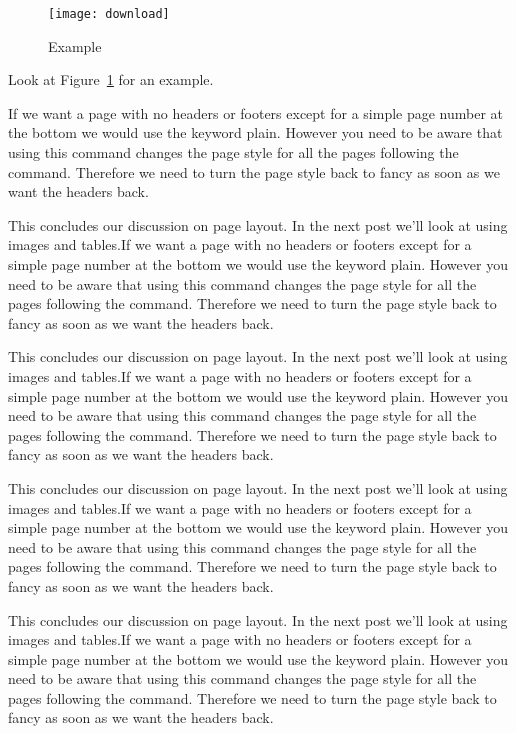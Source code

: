\begin{figure}[h]
    \centering
    \texttt{[image: download]}
    \caption{Example}
    \label{fig:results}
\end{figure}

Look at Figure~\ref{fig:results} for an example.

If we want a page with no headers or footers except for a simple page number at the bottom we would use the keyword plain. However you need to be aware that using this command changes the page style for all the pages following the command. Therefore we need to turn the page style back to fancy as soon as we want the headers back.

This concludes our discussion on page layout. In the next post we'll look at using images and tables.If we want a page with no headers or footers except for a simple page number at the bottom we would use the keyword plain. However you need to be aware that using this command changes the page style for all the pages following the command. Therefore we need to turn the page style back to fancy as soon as we want the headers back.

This concludes our discussion on page layout. In the next post we'll look at using images and tables.If we want a page with no headers or footers except for a simple page number at the bottom we would use the keyword plain. However you need to be aware that using this command changes the page style for all the pages following the command. Therefore we need to turn the page style back to fancy as soon as we want the headers back.

This concludes our discussion on page layout. In the next post we'll look at using images and tables.If we want a page with no headers or footers except for a simple page number at the bottom we would use the keyword plain. However you need to be aware that using this command changes the page style for all the pages following the command. Therefore we need to turn the page style back to fancy as soon as we want the headers back.

This concludes our discussion on page layout. In the next post we'll look at using images and tables.If we want a page with no headers or footers except for a simple page number at the bottom we would use the keyword plain. However you need to be aware that using this command changes the page style for all the pages following the command. Therefore we need to turn the page style back to fancy as soon as we want the headers back.

